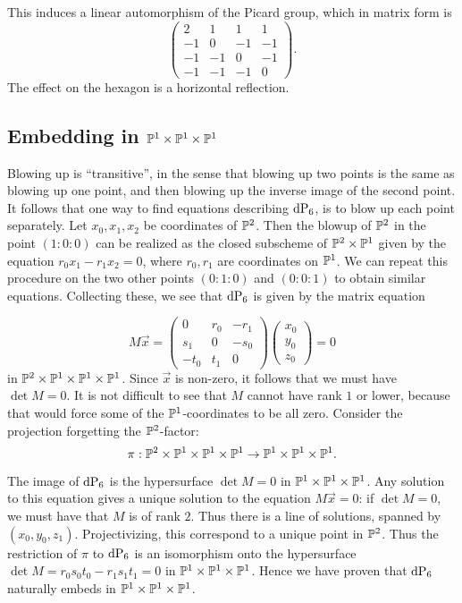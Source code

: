 This induces a linear automorphism of the Picard group, which in matrix form is
\[
\begin{pmatrix}
2 & 1 & 1 & 1 \\
-1& 0 & -1 &-1 \\
-1& -1 & 0 &-1 \\
-1& -1 & -1 &0
\end{pmatrix}.
\]
The effect on the hexagon is a horizontal reflection.

\subsection{Embedding in $\P^1 \times \P^1 \times \P^1$}
\label{sec:emb_p1p1p1}

Blowing up is ``transitive'', in the sense that blowing up two points is the same as blowing up one point, and then blowing up the inverse image of the second point. It follows that one way to find equations describing $\dP6$, is to blow up each point separately. Let $x_0,x_1,x_2$ be coordinates of $\P^2$. Then the blowup of $\P^2$ in the point $(1:0:0)$ can be realized as the closed subscheme of $\P^2 \times \P^1$ given by the equation $r_0x_1-r_1x_2=0$, where $r_0,r_1$ are coordinates on $\P^1$. We can repeat this procedure on the two other points $(0:1:0)$ and $(0:0:1)$ to obtain similar equations. Collecting these, we see that $\dP6$ is given by the matrix equation

\[
M\vec x = 
\begin{pmatrix}
0 & r_0 & -r_1 \\
s_1 & 0 & -s_0 \\
-t_0 & t_1 & 0
\end{pmatrix}
\begin{pmatrix}
x_0 \\ y_0 \\ z_0
\end{pmatrix}= 0
\]
in $\P^2 \times \P^1 \times \P^1 \times \P^1$. Since $\vec x$ is non-zero, it follows that we must have $\det M = 0$. It is not difficult to see that $M$ cannot have rank $1$ or lower, because that would force some of the $\P^1$-coordinates to be all zero. Consider the projection forgetting the $\P^2$-factor:
$$
\pi:\P^2 \times \P^1 \times \P^1 \times \P^1 \to \P^1 \times \P^1 \times \P^1.
$$

The image of $\dP6$ is the hypersurface $\det M = 0$ in $\P^1 \times \P^1 \times \P^1$. Any solution to this equation gives a unique solution to the equation $M \vec x = 0$: if $\det M = 0$, we must have that $M$ is of rank $2$. Thus there is a line of solutions, spanned by $(x_0,y_0,z_1)$. Projectivizing, this correspond to a unique point in $\P^2$. Thus the restriction of $\pi$ to $\dP6$ is an isomorphism onto the hypersurface $\det M=r_0s_0t_0-r_1s_1t_1=0$ in $\P^1 \times \P^1 \times \P^1$. Hence we have proven that $\dP6$ naturally embeds in $\P^1 \times \P^1 \times \P^1$. 

